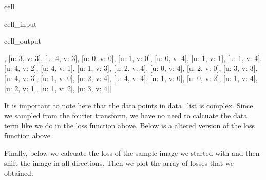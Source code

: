 \documentclass[letterpaper,10pt,english]{jupyterBook}
\begin{document}
\begin{sphinxuseclass}{cell}\begin{sphinxVerbatimInput}

\begin{sphinxuseclass}{cell_input}
\begin{sphinxVerbatim}[commandchars=\\\{\}]
   
\end{sphinxVerbatim}

\end{sphinxuseclass}\end{sphinxVerbatimInput}
\begin{sphinxVerbatimOutput}

\begin{sphinxuseclass}{cell_output}
\begin{sphinxVerbatim}[commandchars=\\\{\}]
[[u: \PYGZhy{}4, v: 1],
 [u: \PYGZhy{}3, v: \PYGZhy{}3],
 [u: \PYGZhy{}4, v: 3],
 [u: 0, v: 0],
 [u: \PYGZhy{}1, v: 0],
 [u: 0, v: 4],
 [u: 1, v: \PYGZhy{}1],
 [u: \PYGZhy{}1, v: \PYGZhy{}4],
 [u: 4, v: \PYGZhy{}2],
 [u: 4, v: \PYGZhy{}1],
 [u: 1, v: \PYGZhy{}3],
 [u: 2, v: \PYGZhy{}4],
 [u: 0, v: \PYGZhy{}4],
 [u: \PYGZhy{}2, v: 0],
 [u: \PYGZhy{}3, v: 3],
 [u: \PYGZhy{}4, v: 3],
 [u: \PYGZhy{}1, v: 0],
 [u: 2, v: \PYGZhy{}4],
 [u: 4, v: 4],
 [u: \PYGZhy{}1, v: 0],
 [u: 0, v: 2],
 [u: 1, v: 4],
 [u: \PYGZhy{}2, v: 1],
 [u: \PYGZhy{}1, v: \PYGZhy{}2],
 [u: \PYGZhy{}3, v: 4]]
\end{sphinxVerbatim}

\end{sphinxuseclass}\end{sphinxVerbatimOutput}

\end{sphinxuseclass}
\sphinxAtStartPar
It is important to note here that the data points in data\_list is complex. Since we sampled from the fourier transform, we have no need to calcuate the data term like we do in the loss function above. Below is a altered version of the loss function above.

\sphinxAtStartPar
Finally, below we calcuate the loss of the sample image we started with and then shift the image in all directions. Then we plot the array of losses that we obtained.
\end{document}
